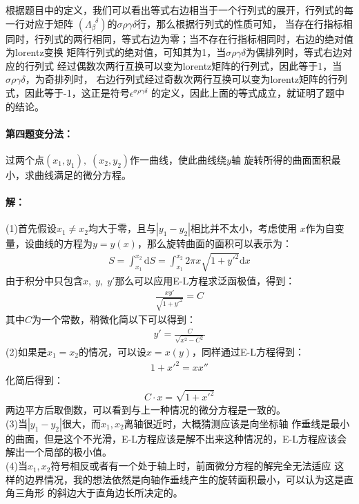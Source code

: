 \documentclass[a4paper]{ctexart}
\def\d{\mathrm{d}}
\begin{document}
    根据题目中的定义，我们可以看出等式右边相当于一个行列式的展开，行列式的每一行对应于矩阵
    $(\Lambda_{\beta}^{\;\;\delta})$的$\sigma\rho\gamma\delta$行，那么根据行列式的性质可知，
    当存在行指标相同时，行列式的两行相同，等式右边为零；当不存在行指标相同时，右边的绝对值为lorentz变换
    矩阵行列式的绝对值，可知其为1，当$\sigma\rho\gamma\delta$为偶排列时，等式右边对应的行列式
    经过偶数次两行互换可以变为lorentz矩阵的行列式，因此等于1，当$\sigma\rho\gamma\delta$，为奇排列时，
    右边行列式经过奇数次两行互换可以变为lorentz矩阵的行列式，因此等于-1，这正是符号$\epsilon^{\sigma\rho\gamma\delta}$
    的定义，因此上面的等式成立，就证明了题中的结论。
    \paragraph{第四题\;变分法：}
    过两个点$(x_{1}, y_{1}),\;(x_{2}, y_{2})$作一曲线，使此曲线绕$y$轴
    旋转所得的曲面面积最小，求曲线满足的微分方程。
    \paragraph{解：}
    (1)\;首先假设$x_{1} \neq x_{2}$均大于零，且与$|y_{1} - y_{2}|$相比并不太小，考虑使用
    $x$作为自变量，设曲线的方程为$y = y(x)$，那么旋转曲面的面积可以表示为：
    \begin{align}
        S = \int_{x_{1}}^{x_{2}}\d S = \int_{x_{1}}^{x_{2}}2\pi x\sqrt{1 + y'^{2}}\d x
    \end{align}
    由于积分中只包含$x,\;y,\;y'$那么可以应用E-L方程求泛函极值，得到：
    \begin{align}
        \frac{xy'}{\sqrt{1 + y'^{2}}} = C
    \end{align}
    其中$C$为一个常数，稍微化简以下可以得到：
    \begin{align}
        y' = \frac{C}{\sqrt{x^{2} - C^{2}}}
    \end{align}
    (2)\;如果是$x_{1} = x_{2}$的情况，可以设$x = x(y)$，同样通过E-L方程得到：
    \begin{align}
    1 + x'^{2} = x x''
    \end{align}
    化简后得到：
    \begin{align}
    C\cdot x = \sqrt{1 + x'^{2}}
    \end{align}
    两边平方后取倒数，可以看到与上一种情况的微分方程是一致的。\\
    (3)\;当$|y_{1} - y_{2}|$很大，而$x_{1}, x_{2}$离轴很近时，大概猜测应该是向坐标轴
    作垂线是最小的曲面，但是这个不光滑，E-L方程应该是解不出来这种情况的，E-L方程应该会
    解出一个局部的极小值。\\
    (4)\;当$x_{1}, x_{2}$符号相反或者有一个处于轴上时，前面微分方程的解完全无法适应
    这样的边界情况，我的想法依然是向轴作垂线产生的旋转面积最小，可以认为这是直角三角形
    的斜边大于直角边长所决定的。
\end{document}
